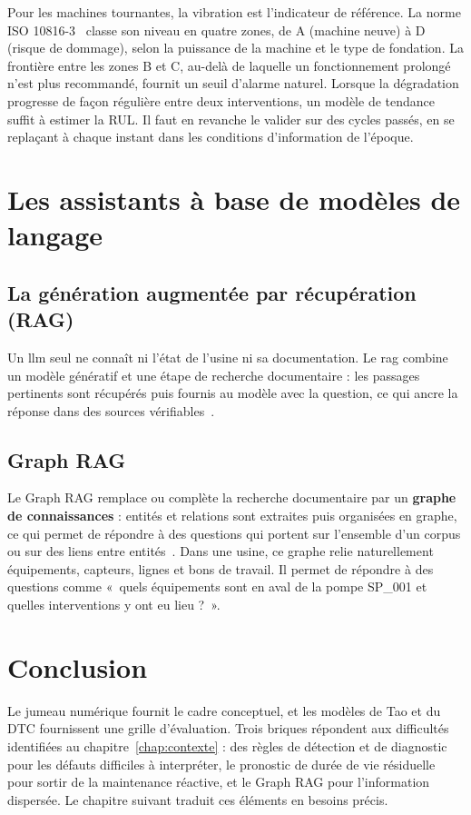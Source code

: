 Pour les machines tournantes, la vibration est l'indicateur de référence. La norme ISO 10816-3~\cite{iso10816} classe son niveau en quatre zones, de A (machine neuve) à D (risque de dommage), selon la puissance de la machine et le type de fondation. La frontière entre les zones B et C, au-delà de laquelle un fonctionnement prolongé n'est plus recommandé, fournit un seuil d'alarme naturel. Lorsque la dégradation progresse de façon régulière entre deux interventions, un modèle de tendance suffit à estimer la RUL. Il faut en revanche le valider sur des cycles passés, en se replaçant à chaque instant dans les conditions d'information de l'époque.

\section{Les assistants à base de modèles de langage}

\subsection{La génération augmentée par récupération (RAG)}
Un \gls{llm} seul ne connaît ni l'état de l'usine ni sa documentation. Le \gls{rag} combine un modèle génératif et une étape de recherche documentaire : les passages pertinents sont récupérés puis fournis au modèle avec la question, ce qui ancre la réponse dans des sources vérifiables~\cite{lewis2020}.

\subsection{Graph RAG}
Le Graph RAG remplace ou complète la recherche documentaire par un \textbf{graphe de connaissances} : entités et relations sont extraites puis organisées en graphe, ce qui permet de répondre à des questions qui portent sur l'ensemble d'un corpus ou sur des liens entre entités~\cite{edge2024}. Dans une usine, ce graphe relie naturellement équipements, capteurs, lignes et bons de travail. Il permet de répondre à des questions comme «~quels équipements sont en aval de la pompe SP\_001 et quelles interventions y ont eu lieu ?~».

\section{Conclusion}
Le jumeau numérique fournit le cadre conceptuel, et les modèles de Tao et du DTC fournissent une grille d'évaluation. Trois briques répondent aux difficultés identifiées au chapitre~\ref{chap:contexte} : des règles de détection et de diagnostic pour les défauts difficiles à interpréter, le pronostic de durée de vie résiduelle pour sortir de la maintenance réactive, et le Graph RAG pour l'information dispersée. Le chapitre suivant traduit ces éléments en besoins précis.
